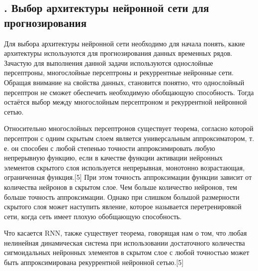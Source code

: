 \setcounter{chaptercntr}{4}



\titlespace

\subsection*{ 
  \gostTitleFont
  \redline
  \thechaptercntr .\thesubchaptercntr \spc 
  Выбор архитектуры нейронной сети для прогнозирования
} \addtocounter{subchaptercntr}{1} 

\subtitlespace

{\gostFont

  \par \redline Для выбора архитектуры нейронной сети необходимо для начала понять, какие архитектуры используются для прогнозирования данных временных рядов. Зачастую для выполнения данной задачи используются однослойные персептроны, многослойные персептроны и рекуррентные нейронные сети. Обращая внимание на свойства данных, становится понятно, что однослойный персептрон не сможет обеспечить необходимую обобщающую способность. Тогда остаётся выбор между многослойным персептроном и рекуррентной нейронной сетью. 
  
  \par \redline Относительно многослойных персептронов существует теорема, согласно которой персептрон с одним скрытым слоем является универсальным аппроксиматором, т. е. он способен с любой степенью точности аппроксимировать любую непрерывную функцию, если в качестве функции активации нейронных элементов скрытого слоя используется непрерывная, монотонно возрастающая, ограниченная функция.[5] При этом точность аппроксимации функции зависит от количества нейронов в скрытом слое. Чем больше количество нейронов, тем больше точность аппроксимации. Однако при слишком большой размерности скрытого слоя может наступить явление, которое называется перетренировкой сети, когда сеть имеет плохую обобщающую способность.  

  \par \redline Что касается RNN, также существует теорема, говорящая нам о том, что любая нелинейная динамическая система при использовании достаточного количества сигмоидальных нейронных элементов в скрытом слое с любой точностью может быть аппроксимирована рекуррентной нейронной сетью.[5] 

}
